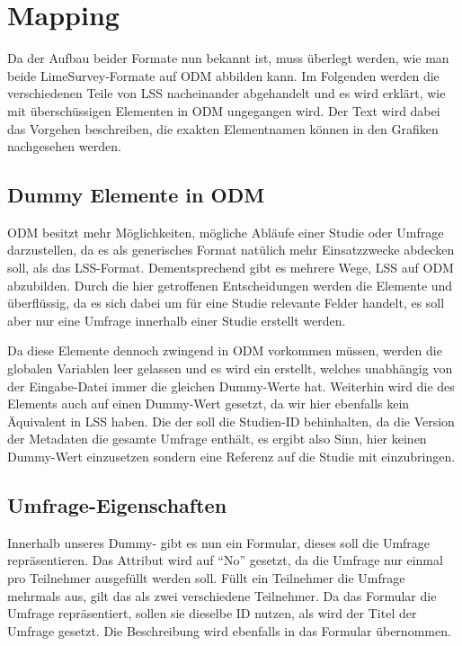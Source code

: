 \section{Mapping}

Da der Aufbau beider Formate nun bekannt ist, muss überlegt werden, wie man beide LimeSurvey-Formate auf ODM abbilden kann. Im Folgenden werden die verschiedenen Teile von LSS nacheinander abgehandelt und es wird erklärt, wie mit überschüssigen Elementen in ODM ungegangen wird.
Der Text wird dabei das Vorgehen beschreiben, die exakten Elementnamen können in den Grafiken nachgesehen werden.

\subsection{Dummy Elemente in ODM}

ODM besitzt mehr Möglichkeiten, mögliche Abläufe einer Studie oder Umfrage darzustellen, da es als generisches Format natülich mehr Einsatzzwecke abdecken soll, als das LSS-Format.
Dementsprechend gibt es mehrere Wege, LSS auf ODM abzubilden.
Durch die hier getroffenen Entscheidungen werden die Elemente  und  überflüssig,	da es sich dabei um für eine Studie relevante Felder handelt, es soll aber nur eine Umfrage innerhalb einer Studie erstellt werden.

Da diese Elemente dennoch zwingend in ODM vorkommen müssen, werden die globalen Variablen leer gelassen und es wird ein  erstellt, welches unabhängig von der Eingabe-Datei immer die gleichen Dummy-Werte hat.
Weiterhin wird die  des  Elements auch auf einen Dummy-Wert gesetzt, da wir hier ebenfalls kein Äquivalent in LSS haben.
Die  der  soll die Studien-ID behinhalten, da die Version der Metadaten die gesamte Umfrage enthält, es ergibt also Sinn, hier keinen Dummy-Wert einzusetzen sondern eine Referenz auf die Studie mit einzubringen.

\subsection{Umfrage-Eigenschaften}
\label{m:survey_meta}

Innerhalb unseres Dummy- gibt es nun ein Formular, dieses soll die Umfrage repräsentieren.
Das  Attribut wird auf \enquote{No} gesetzt, da die Umfrage nur einmal pro Teilnehmer ausgefüllt werden soll.
Füllt ein Teilnehmer die Umfrage mehrmals aus, gilt das als zwei verschiedene Teilnehmer.
Da das Formular die Umfrage repräsentiert, sollen sie dieselbe ID nutzen, als  wird der Titel der Umfrage gesetzt. Die Beschreibung wird ebenfalls in das Formular übernommen.

